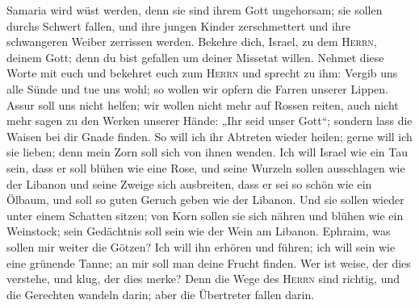  Samaria wird wüst werden, denn sie sind ihrem Gott
ungehorsam; sie sollen durchs Schwert fallen, und ihre jungen Kinder
zerschmettert und ihre schwangeren Weiber zerrissen werden.
 Bekehre dich, Israel, zu dem \textsc{Herrn}, deinem Gott;
denn du bist gefallen um deiner Missetat willen.  Nehmet
diese Worte mit euch und bekehret euch zum \textsc{Herrn} und sprecht zu
ihm: Vergib uns alle Sünde und tue uns wohl; so wollen wir opfern die
Farren unserer Lippen.  Assur soll uns nicht helfen; wir
wollen nicht mehr auf Rossen reiten, auch nicht mehr sagen zu den Werken
unserer Hände: „Ihr seid unser Gott``; sondern lass die Waisen bei dir
Gnade finden.  So will ich ihr Abtreten wieder heilen;
gerne will ich sie lieben; denn mein Zorn soll sich von ihnen wenden.
 Ich will Israel wie ein Tau sein, dass er soll blühen wie
eine Rose, und seine Wurzeln sollen ausschlagen wie der Libanon
 und seine Zweige sich ausbreiten, dass er sei so schön
wie ein Ölbaum, und soll so guten Geruch geben wie der Libanon.
 Und sie sollen wieder unter einem Schatten sitzen; von
Korn sollen sie sich nähren und blühen wie ein Weinstock; sein
Gedächtnis soll sein wie der Wein am Libanon.  Ephraim,
was sollen mir weiter die Götzen? Ich will ihn erhören und führen; ich
will sein wie eine grünende Tanne; an mir soll man deine Frucht finden.
 Wer ist weise, der dies verstehe, und klug, der dies
merke? Denn die Wege des \textsc{Herrn} sind richtig, und die Gerechten
wandeln darin; aber die Übertreter fallen darin.
